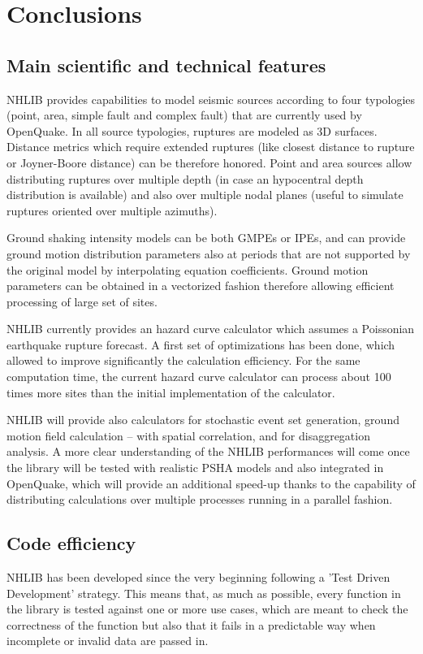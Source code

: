 \documentclass[11pt,a4paper,headings=small,dvips]{scrartcl}
\begin{document}
\section{Conclusions}\label{conclusions}
\setcounter{figure}{0}
%
\subsection{Main scientific and technical features}
%
NHLIB provides capabilities to model seismic sources according to 
four typologies (point, area, simple fault and complex fault) that 
are currently used by OpenQuake. In all source typologies, ruptures 
are modeled as 3D surfaces. Distance metrics which require extended 
ruptures (like closest distance to rupture or Joyner-Boore distance) 
can be therefore honored. Point and area sources allow distributing 
ruptures over multiple depth (in case an hypocentral depth distribution 
is available) and also over multiple nodal planes (useful to simulate 
ruptures oriented over multiple azimuths).

Ground shaking intensity models can be both GMPEs or IPEs, and can 
provide ground motion distribution parameters also at periods that 
are not supported by the original model by interpolating equation 
coefficients. Ground motion parameters can be obtained in a vectorized 
fashion therefore allowing efficient processing of large set of sites.

NHLIB currently provides an hazard curve calculator which assumes a 
Poissonian earthquake rupture forecast. A first set of optimizations 
has been done, which allowed to improve significantly the calculation 
efficiency. For the same computation time, the current hazard curve 
calculator can process about 100 times more sites than the initial 
implementation of the calculator.

NHLIB will provide also calculators for stochastic event set generation, 
ground motion field calculation -- with spatial correlation, and for 
disaggregation analysis. A more clear understanding of the NHLIB 
performances will come once the library will be tested with realistic 
PSHA models and also integrated in OpenQuake, which will provide an 
additional speed-up thanks to the capability of distributing calculations 
over multiple processes running in a parallel fashion.

\subsection{Code efficiency}
%
NHLIB has been developed since the very beginning following a 'Test 
Driven Development' strategy. This means that, as much as possible, 
every function in the library is tested against one or more use cases,
which are meant to check the correctness of the function but also that 
it fails in a predictable way when incomplete or invalid data are 
passed in. 
\end{document}
